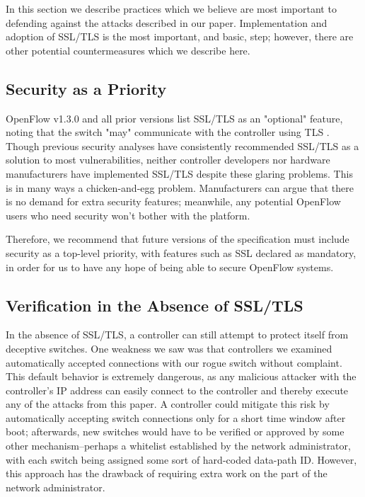 In this section we describe practices which we believe are most important to defending against the attacks described in our paper. Implementation and adoption of SSL/TLS is the most important, and basic, step; however, there are other potential countermeasures which we describe here.

\subsection{Security as a Priority}

OpenFlow v1.3.0 and all prior versions list SSL/TLS as an "optional" feature, noting that the switch "may" communicate with the controller using TLS \cite{ietf}. Though previous security analyses have consistently recommended SSL/TLS as a solution to most vulnerabilities, neither controller developers nor hardware manufacturers have implemented SSL/TLS despite these glaring problems. This is in many ways a chicken-and-egg problem. Manufacturers can argue that there is no demand for extra security features; meanwhile, any potential OpenFlow users who need security won't bother with the platform.

Therefore, we recommend that future versions of the specification must include security as a top-level priority, with features such as SSL declared as mandatory, in order for us to have any hope of being able to secure OpenFlow systems. 

\subsection{Verification in the Absence of SSL/TLS}

In the absence of SSL/TLS,  a controller can still attempt to protect itself from deceptive switches. One weakness we saw was that controllers we examined automatically accepted connections with our rogue switch without complaint. This default behavior is extremely dangerous, as any malicious attacker with the controller's IP address can easily connect to the controller and thereby execute any of the attacks from this paper. A controller could mitigate this risk by automatically accepting switch connections only for a short time window after boot; afterwards, new switches would have to be verified or approved by some other mechanism--perhaps a whitelist established by the network administrator, with each switch being assigned some sort of hard-coded data-path ID. However, this approach has the drawback of requiring extra work on the part of the network administrator.

